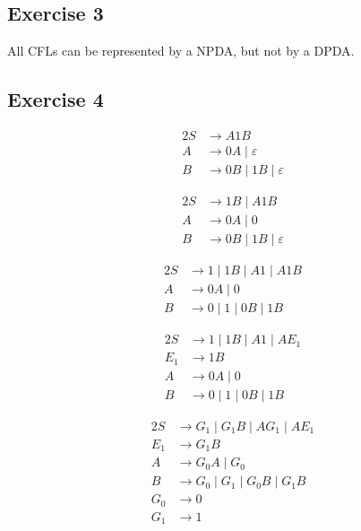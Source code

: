 \documentclass[docid=TP10]{tcom_TP}
\begin{document}
{\subsection{Exercise 3}
All CFLs can be represented by a NPDA, but not by a DPDA.
\subsection{Exercise 4}
\begin{minipage}[c]{0.25\textwidth} \begin{alignat*}{2}
	S &\rightarrow A1B \\
	A &\rightarrow 0A\mid \varepsilon\\
	B &\rightarrow 0B\mid 1B\mid \varepsilon
\end{alignat*} \end{minipage}%
\begin{minipage}[c]{0.25\textwidth} \begin{alignat*}{2}
	S &\rightarrow 1B\mid A1B \\
	A &\rightarrow 0A\mid 0\\
	B &\rightarrow 0B\mid 1B\mid \varepsilon
\end{alignat*} \end{minipage}%
\begin{minipage}[c]{0.25\textwidth} \begin{alignat*}{2}
	S &\rightarrow 1\mid 1B\mid A1\mid A1B \\
	A &\rightarrow 0A\mid 0\\
	B &\rightarrow 0\mid 1\mid 0B\mid 1B
\end{alignat*} \end{minipage}%
\begin{minipage}[c]{0.25\textwidth} \begin{alignat*}{2}
	S &\rightarrow 1\mid 1B\mid A1\mid AE_1 \\
	E_1 &\rightarrow 1B\\
	A &\rightarrow 0A\mid 0\\
	B &\rightarrow 0\mid 1\mid 0B\mid 1B
\end{alignat*} \end{minipage}
\begin{alignat*}{2}
	S &\rightarrow G_1\mid G_1B\mid AG_1\mid AE_1 \\
	E_1 &\rightarrow G_1B\\
	A &\rightarrow G_0A\mid G_0\\
	B &\rightarrow G_0\mid G_1\mid G_0B\mid G_1B\\
	G_0 &\rightarrow 0\\
	G_1 &\rightarrow 1
\end{alignat*}
}
\end{document}

